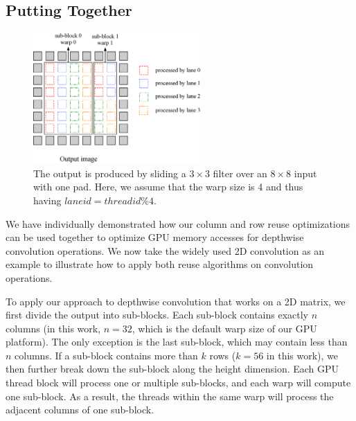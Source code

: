 \subsection{Putting Together}
\label{sec:together}
\begin{figure}
	\centering
	\includegraphics[width=0.8\columnwidth,height=5cm]{./figure/overalldesign.eps} 
	\vspace{-3mm}
	\caption{The output is produced by sliding a $3 \times
3$ filter over an $8 \times 8$ input with one pad. Here, we assume
that the warp size is 4 and thus having $laneid=threadid\%4$.} \label{fig:overalldesign}
\end{figure}


We have individually demonstrated how our column and row reuse optimizations can be used together to optimize GPU memory accesses for
depthwise convolution operations. We now take the widely used 2D convolution as an example to illustrate how to apply both reuse algorithms
on convolution operations.


To apply our approach to depthwise convolution that works on a 2D matrix, we first divide the output into sub-blocks. Each sub-block
contains exactly $n$ columns (in this work, $n = 32$, which is the default warp size of our GPU platform). The only exception is the last
sub-block, which may contain less than $n$ columns. If a sub-block contains more than $k$ rows ($k=56$ in this work), we then further
break down the sub-block along the height dimension. Each GPU thread block will process one or multiple sub-blocks, and each warp will
compute one sub-block. As a result, the threads within the same warp will process the adjacent columns of one sub-block.



